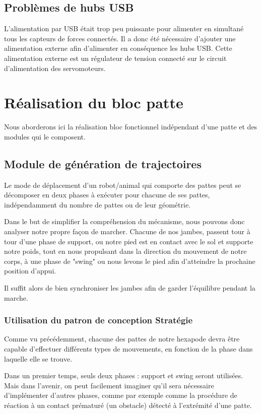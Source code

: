 \documentclass{tnreport}
\begin{document}
\subsection{Problèmes de hubs USB}
L'alimentation par USB était trop peu puissante pour alimenter en simultané tous les capteurs de forces connectés. Il a donc été nécessaire d'ajouter une alimentation externe afin d'alimenter en conséquence les hubs USB. Cette alimentation externe est un régulateur de tension connecté sur le circuit d'alimentation des servomoteurs.

\section{Réalisation du bloc patte}
Nous aborderons ici la réalisation bloc fonctionnel indépendant d'une patte et des modules qui le composent. 

\subsection{Module de génération de trajectoires}\label{lb:trajectory}

Le mode de déplacement d'un robot/animal qui comporte des pattes peut se décomposer en deux phases à exécuter pour chacune de ses pattes, indépendamment du nombre de pattes ou de leur géométrie.

Dans le but de simplifier la compréhension du mécanisme, nous pouvons donc analyser notre propre façon de marcher. Chacune de nos jambes, passent tour à tour d'une phase de support, ou notre pied est en contact avec le sol et supporte notre poids, tout en nous propulsant dans la direction du mouvement de notre corps, à une phase de "swing" ou nous levons le pied afin d'atteindre la prochaine position d'appui. 

Il suffit alors de bien synchroniser les jambes afin de garder l'équilibre pendant la marche.  
\subsubsection{Utilisation du patron de conception Stratégie }
Comme vu précédemment, chacune des pattes de notre hexapode devra être capable d'effectuer différents types de mouvements, en fonction de la phase dans laquelle elle se trouve. 

Dans un premier temps, seuls deux phases : support et swing seront utilisées. Mais dans l'avenir, on peut facilement imaginer qu'il sera nécessaire d'implémenter d'autres phases, comme par exemple comme la procédure de réaction à un contact prématuré (un obstacle) détecté à l'extrémité d'une patte.
\end{document}
